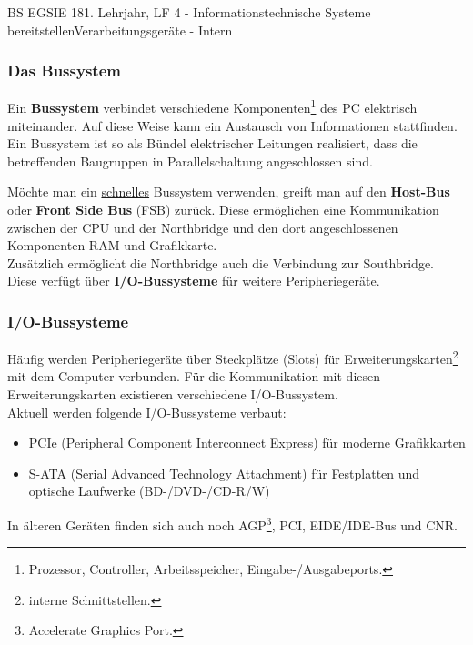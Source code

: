\documentclass[oneside,openany,headings=optiontotoc,11pt,numbers=noenddot]{article}
\begin{document}
\begin{worksheet}{BS EGSIE 18}{1. Lehrjahr, LF 4 - Informationstechnische Systeme bereitstellen}{Verarbeitungsgeräte - Intern}
		\subsubsection*{Das Bussystem}
		Ein \textbf{Bussystem} verbindet verschiedene Komponenten\footnote{Prozessor, Controller, Arbeitsspeicher, Eingabe-/Ausgabeports.} des PC elektrisch miteinander. Auf diese Weise kann ein Austausch von Informationen stattfinden.\\
		Ein Bussystem ist so als Bündel elektrischer Leitungen realisiert, dass die betreffenden Baugruppen in Parallelschaltung angeschlossen sind.\\
		\par\noindent
		Möchte man ein \underline{schnelles} Bussystem verwenden, greift man auf den \textbf{Host-Bus} oder \textbf{Front Side Bus} (FSB) zurück. Diese ermöglichen eine Kommunikation zwischen der CPU und der Northbridge und den dort angeschlossenen Komponenten RAM und Grafikkarte.\\
		Zusätzlich ermöglicht die Northbridge auch die Verbindung zur Southbridge. Diese verfügt über \textbf{I/O-Bussysteme} für weitere Peripheriegeräte.
		\subsubsection*{I/O-Bussysteme}
		Häufig werden Peripheriegeräte über Steckplätze (Slots) für Erweiterungskarten\footnote{interne Schnittstellen.} mit dem Computer verbunden. Für die Kommunikation mit diesen Erweiterungskarten existieren verschiedene I/O-Bussystem.\\
		Aktuell werden folgende I/O-Bussysteme verbaut:
		\begin{itemize}
			\item PCIe (Peripheral Component Interconnect Express) für moderne Grafikkarten
			\item S-ATA (Serial Advanced Technology Attachment) für Festplatten und optische Laufwerke (BD-/DVD-/CD-R/W)
		\end{itemize}
		In älteren Geräten finden sich auch noch AGP\footnote{Accelerate Graphics Port.}, PCI, EIDE/IDE-Bus und CNR.
		\newpage

\end{worksheet}
\end{document}
